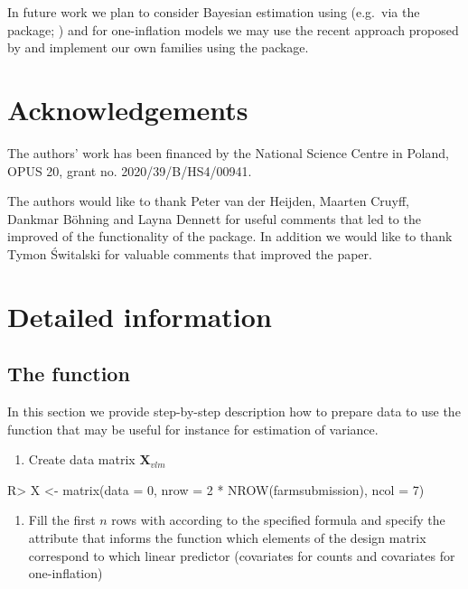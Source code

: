 \documentclass[
]{jss}
\providecommand{\tightlist}{%
  \setlength{\itemsep}{0pt}\setlength{\parskip}{0pt}}
\newcommand{\1}{\mathcal{I}} \newcommand{\bZero}{\boldsymbol{0}}
\begin{document}
In future work we plan to consider Bayesian estimation using
 (e.g.~via the  package;
\cite{carpenter2017stan, brms}) and for one-inflation models we may use
the recent approach proposed by \cite{tuoto2022bayesian} and implement
our own families using the  package.

\section{Acknowledgements}\label{Acknowledgements}

The authors' work has been financed by the National Science Centre in
Poland, OPUS 20, grant no. 2020/39/B/HS4/00941.

The authors would like to thank Peter van der Heijden, Maarten Cruyff,
Dankmar Böhning and Layna Dennett for useful comments that led to the
improved of the functionality of the package. In addition we would like
to thank Tymon Świtalski for valuable comments that improved the paper.

\appendix

\section{Detailed information}\label{sec-details}

\subsection[The estimatePopsizeFit function]{The
 function}\label{sec-estimatePopsizeFit}

In this section we provide step-by-step description how to prepare data
to use the  function that may be useful for
instance for estimation of variance.

\begin{enumerate}
\def\labelenumi{\arabic{enumi}.}
\tightlist
\item
  Create data matrix \(\boldsymbol{X}_{vlm}\)
\end{enumerate}

\begin{CodeChunk}
\begin{CodeInput}
R> X <- matrix(data = 0, nrow = 2 * NROW(farmsubmission), ncol = 7)
\end{CodeInput}
\end{CodeChunk}

\begin{enumerate}
\def\labelenumi{\arabic{enumi}.}
\setcounter{enumi}{1}
\tightlist
\item
  Fill the first \(n\) rows with  according to the
  specified formula and specify the attribute  that
  informs the function which elements of the design matrix correspond to
  which linear predictor (covariates for counts and covariates for
  one-inflation)
\end{enumerate}
\end{document}
